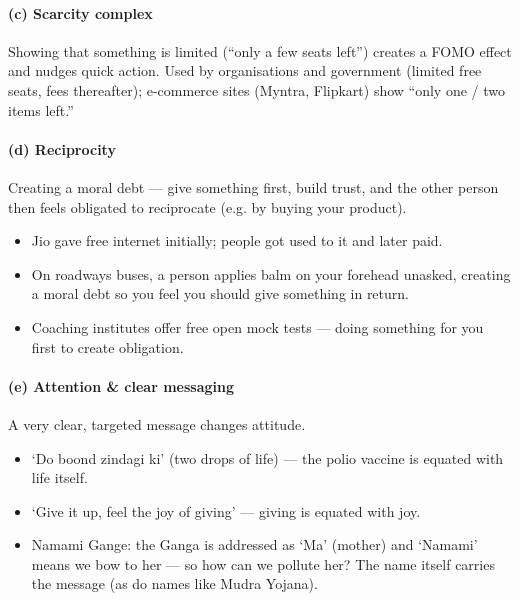 \paragraph{(c) Scarcity complex} Showing that something is limited (``only a few seats left'') creates a FOMO effect and nudges quick action. Used by organisations and government (limited free seats, fees thereafter); e-commerce sites (Myntra, Flipkart) show ``only one / two items left.''

\paragraph{(d) Reciprocity} Creating a moral debt --- give something first, build trust, and the other person then feels obligated to reciprocate (e.g. by buying your product).

\begin{ExampleBox}
\begin{itemize}
\item Jio gave free internet initially; people got used to it and later paid.
\item On roadways buses, a person applies balm on your forehead unasked, creating a moral debt so you feel you should give something in return.
\item Coaching institutes offer free open mock tests --- doing something for you first to create obligation.
\end{itemize}
\end{ExampleBox}

\paragraph{(e) Attention \& clear messaging} A very clear, targeted message changes attitude.

\begin{GovtPolicy}
\begin{itemize}
\item `Do boond zindagi ki' (two drops of life) --- the polio vaccine is equated with life itself.
\item `Give it up, feel the joy of giving' --- giving is equated with joy.
\item Namami Gange: the Ganga is addressed as `Ma' (mother) and `Namami' means we bow to her --- so how can we pollute her? The name itself carries the message (as do names like Mudra Yojana).
\end{itemize}
\end{GovtPolicy}

